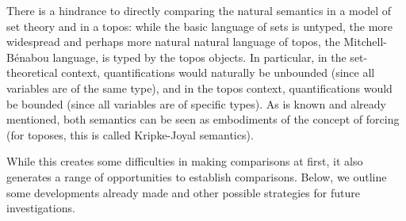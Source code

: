 \documentclass[10pt,longbibliography]{article}
\begin{document}

There is a hindrance to directly comparing the natural semantics in a model of set theory and in a topos: while the basic language of sets is untyped, the more widespread and perhaps more natural natural language of topos, the Mitchell-Bénabou language, is typed by the topos objects. In particular, in the set-theoretical context, quantifications would naturally be unbounded (since all variables are of the same type), and in the topos context, quantifications would be bounded (since all variables are of specific types). As is known and already mentioned, both semantics can be seen as embodiments of the concept of forcing (for toposes, this is called Kripke-Joyal semantics).





While this creates some difficulties in making comparisons at first, it also generates a range of opportunities to establish comparisons. Below, we outline some developments already made and other possible strategies for future investigations.




\end{document}
